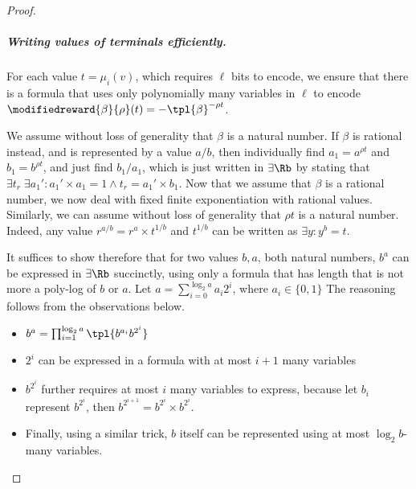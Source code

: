 \begin{proof}
         \subparagraph*{Writing values of terminals efficiently.}
        For each value $t = \mu_i(v)$, which requires $\ell$ bits to encode, we ensure that there is a formula that uses only polynomially many variables in $\ell$ to encode $\modifiedreward{\beta}{\rho}(t) = -\tpl{\beta}^{-\rho t}$. 

        We assume without loss of generality that $\beta$ is a natural number. If $\beta$ is rational instead, and is represented by a value $a/b$, then individually find $a_1  = a^{\rho t}$ and $b_1 = b^{\rho t}$, and just find $b_1/a_1$, which is just written in $\exists\Rb$ by stating that $\exists  t_r \;\exists a_1'\colon a_1'\times a_1  = 1\land t_r = a_1'\times b_1$.
        Now that we assume that $\beta$ is a rational number, we now deal with fixed finite exponentiation with rational values. Similarly, we can assume without loss of generality that $\rho t$ is a natural number. Indeed, any value $r^{a/b} = r^a\times t^{1/b}$ and $t^{1/b}$ can be written as $\exists y \colon y^b = t$.

        It suffices to show therefore that for two values $b,a$, both natural numbers, $b^a$ can be expressed in $\exists\Rb$ succinctly, using only a formula that has length that is not more a poly-log of $b$ or $a$. 
        Let $a = \sum_{i=0}^{\log_2{a}}a_i 2^i$, where $a_i\in\{0,1\}$ 
        The reasoning follows from the observations below. 
        \begin{itemize}
            \item $b^a = \prod_{i=1}^{\log_2{a}}\tpl{b^{a_i}b^{2^i}}$
            \item  $2^i$ can be expressed in a formula with at most $i+1$ many variables
            \item $b^{2^i}$ further requires at most $i$ many variables to express, because let  $b_i$ represent $b^{2^{i}}$, then $b^{2^{i+1}} = b^{2^i}\times b^{2^i}$.
            \item Finally, using a similar trick, $b$ itself can be represented using at most $\log_2{b}$-many variables. 
        \end{itemize}



\end{proof}
